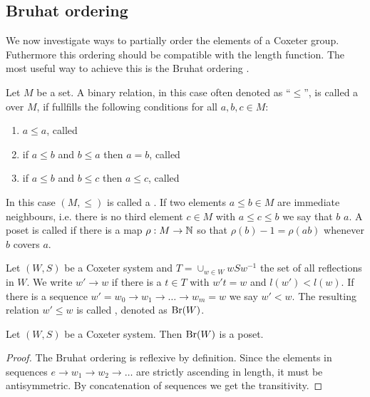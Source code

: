 \subsection{Bruhat ordering}
\label{sec:bruhat-ordering}

We now investigate ways to partially order the elements of a Coxeter group. Futhermore this ordering should be compatible with the length function. The most useful way to achieve this is the Bruhat ordering \cite[Section 5.9]{humphreys:coxeter}.

\begin{defi}
	Let $M$ be a set. A binary relation, in this case often denoted as ``$\leq$'', is called a  over $M$, if fullfills the following conditions for all $a,b,c \in M$:
	\begin{enumerate}
		\item $a \leq a$, called 
		\item if $a \leq b$ and $b \leq a$ then $a=b$, called 
		\item if $a \leq b$ and $b \leq c$ then $a \leq c$, called 
	\end{enumerate}
	In this case $(M,\leq)$ is called a . If two elements $a \leq b \in M$ are immediate neighbours, i.e. there is no third element $c \in M$ with $a \leq c \leq b$ we say that $b$  $a$. A poset is called  if there is a map $\rho : M \to \mathbb{N}$ so that $\rho(b) - 1 = \rho(ab)$ whenever $b$ covers $a$.
\end{defi}

\begin{defi}
	Let $(W,S)$ be a Coxeter system and $T = \cup_{w \in W} wSw^{-1}$ the set of all reflections in $W$. We write $w' \to w$ if there is a $t \in T$ with $w't = w$ and $l(w') < l(w)$. If there is a sequence $w' = w_0 \to w_1 \to \ldots \to w_m = w$ we say $w' < w$. The resulting relation $w' \leq w$ is called , denoted as $\operatorname{Br}(W)$.
\end{defi}

\begin{lemm}
	Let $(W,S)$ be a Coxeter system. Then $\operatorname{Br}(W)$ is a poset.

	\begin{proof}
		The Bruhat ordering is reflexive by definition. Since the elements in sequences $e \to w_1 \to w_2 \to \ldots$ are strictly ascending in length, it must be antisymmetric. By concatenation of sequences we get the transitivity.
	\end{proof}
\end{lemm}

